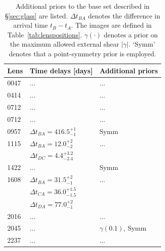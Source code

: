 \documentclass[useAMS,usenatbib]{mn2e}
\begin{document}
\begin{table}
  \begin{center}
    \begin{tabular}{l l l}
      Lens & Time delays [days] & Additional priors \\ \hline
      0047 & ... & ...\\
      0414 & ... & ...\\
      0712 & ... & ...\\
      0712 & ... & ...\\
      0957 & $\Delta t_{BA}=416.5^{+1}_{-1}$ & Symm \\
      1115 & $\Delta t_{BA}=12.0^{+2}_{-2}$ & ...\\
           & $\Delta t_{DC}=4.4^{+3.2}_{-2.4}$ & \\
      1422 & ... & Symm \\
      1608 & $\Delta t_{BA}=31.5^{+2}_{-1}$ & ...\\
           & $\Delta t_{CA}=36.0^{+1.5}_{-1.5}$ & \\
           & $\Delta t_{DA}=77.0^{+2}_{-1}$ & \\
      2016 & ... & ...\\
      2045 & ... & $\gamma(0.1)$, Symm \\
      2237 & ... & ...\\
    \end{tabular}
    \caption[width=\linewidth]{Additional priors to the base set described in \S\ref{sec:glass} are listed. $\Delta t_{BA}$ denotes the difference in arrival time $t_{B}-t_{A}$. The images are defined in Table~\ref{tab:lenspositions}. $\gamma(\cdot)$ denotes a prior on the maximum allowed external shear $|\gamma|$. `Symm' denotes that a point-symmetry prior is employed.}
    \label{tab:lenspriors}
  \end{center}
\end{table}
\end{document}
